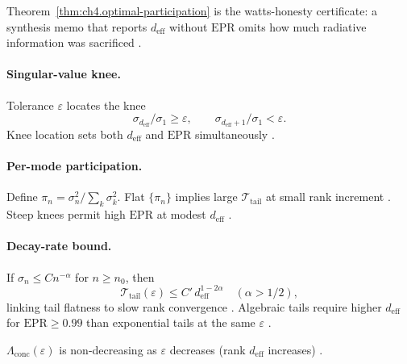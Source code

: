 Theorem~\ref{thm:ch4.optimal-participation} is the watts-honesty certificate: a synthesis memo that reports \(d_{\mathrm{eff}}\) without
\(\mathrm{EPR}\) omits how much radiative information was sacrificed \cite{hansen1988,harrington2001,stratton1941}.

\paragraph{Singular-value knee.}
Tolerance \(\varepsilon\) locates the knee
\begin{equation}
\label{eq:ch4.sv-knee}
\sigma_{d_{\mathrm{eff}}}/\sigma_{1}\ge\varepsilon,\qquad \sigma_{d_{\mathrm{eff}}+1}/\sigma_{1}<\varepsilon.
\end{equation}
Knee location sets both \(d_{\mathrm{eff}}\) and \(\mathrm{EPR}\) simultaneously \cite{hansen1988,harrington2001,devaney2004}.

\paragraph{Per-mode participation.}
Define \(\pi_{n}=\sigma_{n}^{2}/\sum_{k}\sigma_{k}^{2}\). Flat \(\{\pi_{n}\}\) implies large \(\mathcal{T}_{\mathrm{tail}}\) at small rank increment
\cite{devaney2004,hansen1988}. Steep knees permit high \(\mathrm{EPR}\) at modest \(d_{\mathrm{eff}}\) \cite{harrington2001,stratton1941}.

\paragraph{Decay-rate bound.}
If \(\sigma_{n}\le C n^{-\alpha}\) for \(n\ge n_{0}\), then
\begin{equation}
\label{eq:ch4.sv-decay-bound}
\mathcal{T}_{\mathrm{tail}}(\varepsilon)\le C'\,d_{\mathrm{eff}}^{1-2\alpha}\quad(\alpha>1/2),
\end{equation}
linking tail flatness to slow rank convergence \cite{hansen1988,harrington2001,devaney2004}. Algebraic tails require higher \(d_{\mathrm{eff}}\) for
\(\mathrm{EPR}\ge0.99\) than exponential tails at the same \(\varepsilon\) \cite{stratton1941}.

\begin{lemma}
\label{lem:ch4.conc-monotone}
\(\Lambda_{\mathrm{conc}}(\varepsilon)\) is non-decreasing as \(\varepsilon\) decreases (rank \(d_{\mathrm{eff}}\) increases)
\cite{harrington2001,hansen1988,stratton1941,devaney2004}.
\end{lemma}

